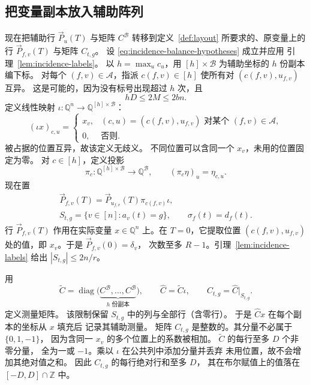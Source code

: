 \documentclass[11pt,reqno]{amsart}
\numberwithin{equation}{section}
\theoremstyle{definition}\newtheorem{definition}[theorem]{定义}
\theoremstyle{remark}\newtheorem{remark}[theorem]{注}
\renewcommand{\le}{\leqslant}
\begin{document}
\subsection{把变量副本放入辅助阵列}\label{subsec:embedding}
现在把辅助行 $\vec{P}_u(T)$ 与矩阵 $C^{\mathcal B}$
转移到定义~\ref{def:layout} 所要求的、原变量上的行
$\vec{P}_{f,v}(T)$ 与矩阵 $C_{t,g}$。
设 \eqref{eq:incidence-balance-hypotheses} 成立并应用
引理~\ref{lem:incidence-labels}。
以 $h=\max_u c_u$，用 $[h]\times\mathcal B$
为辅助坐标的 $h$ 份副本编下标。
对每个 $(f,v)\in\mathcal A$，指派 $c(f,v)\in[h]$
使所有对 $(c(f,v),u_{f,v})$ 互异。
这是可能的，因为没有标号出现超过 $h$ 次，且
\[
 hD\le2M\le2bn.
\]
定义线性映射
$\iota:\mathbb Q^n\longrightarrow\mathbb Q^{[h]\times\mathcal B}$：
\[
 (\iota x)_{c,u}=
 \begin{cases}
 x_v,&(c,u)=(c(f,v),u_{f,v})\text{ 对某个 }(f,v)\in\mathcal A,\\
 0,&\text{否则}.
 \end{cases}
\]
被占据的位置互异，故该定义无歧义。
不同位置可以含同一个 $x_v$，未用的位置固定为零。
对 $c\in[h]$，定义投影
\[
 \pi_c:\mathbb Q^{[h]\times\mathcal B}\longrightarrow\mathbb Q^{\mathcal B},
 \qquad (\pi_c\eta)_u=\eta_{c,u}.
\]
现在置
\begin{equation}\label{eq:actual-rows}
 \begin{gathered}
 \vec{P}_{f,v}(T)=\vec{P}_{u_{f,v}}(T)\pi_{c(f,v)}\iota,\\
 S_{t,g}=\{v\in[n]:a_v(t)=g\},\qquad \sigma_f(t)=d_f(t).
 \end{gathered}
\end{equation}
行 $\vec{P}_{f,v}(T)$ 作用在实际变量 $x\in\mathbb Q^n$
上。在 $T=0$，它提取位置 $(c(f,v),u_{f,v})$
处的值，即 $x_v$。于是 $\vec{P}_{f,v}(0)=\delta_v$，
次数至多 $R-1$。引理~\ref{lem:incidence-labels}
给出 $|S_{t,g}|\le2n/r$。

用
\begin{equation}\label{eq:actual-measurements}
 \widetilde C=\operatorname{diag}
   \bigl(\underbrace{C^{\mathcal B},\ldots,C^{\mathcal B}}_{h\text{ 份副本}}\bigr),
 \qquad \widehat C=\widetilde C\iota,
 \qquad C_{t,g}=\widehat C|_{S_{t,g}}.
\end{equation}
定义测量矩阵。
该限制保留 $S_{t,g}$ 中的列与全部行（含零行）。
于是 $\widehat Cx$ 在每个副本的坐标从 $x$ 填充后
记录其辅助测量。
矩阵 $C_{t,g}$ 是整数的。其分量不必属于 $\{0,1,-1\}$，
因为含同一 $x_v$ 的多个位置上的系数被相加。
$\widetilde C$ 的每行至多 $D$ 个非零分量，
全为一或 $-1$。乘以 $\iota$ 在公共列中添加分量并丢弃
未用位置，故不会增加其绝对值之和。
因此 $C_{t,g}$ 的每行绝对行和至多 $D$，
其在布尔赋值上的值落在 $[-D,D]\cap\mathbb Z$ 中。
\end{document}
